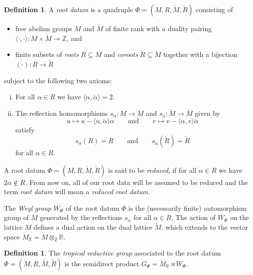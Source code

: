 \documentclass[10pt, a4paper]{amsart}
\theoremstyle{definition}
\newtheorem{definition}[theorem]{Definition}
\theoremstyle{myitemstyle}
\newcommand{\R}{\mathbb{R}}
\newcommand{\ZZ}{\mathbb{Z}}
\newcommand{\RR}{\mathbb{R}}
\newcommand{\Mcheck}{{\check{M}}}
\newcommand{\Rcheck}{\check{R}}
\newcommand{\alphacheck}{\check{\alpha}}
\begin{document}
\begin{definition}
\label{def:rootdatum}
A \emph{root datum} is a quadruple $\Phi=(M,R,\Mcheck,\Rcheck)$ consisting of 
\begin{itemize}
    \item free abelian groups $M$ and $\Mcheck$ of finite rank with a duality pairing $\langle\cdot,\cdot\rangle:M\times \Mcheck\to \ZZ$, and
    \item finite subsets of \emph{roots} $R\subseteq M$ and \emph{coroots} $\Rcheck\subseteq \Mcheck$ together with a bijection $\check{(\cdot)}\colon R\rightarrow \Rcheck$
\end{itemize}
subject to the following two axioms:
\begin{enumerate}[(i)]
    \item For all $\alpha\in R$ we have $\langle \alpha,\alphacheck\rangle=2$.
    \item The reflection homomorphisms $s_\alpha\colon M\rightarrow M$ and $s_{\check\alpha}\colon \Mcheck\rightarrow \Mcheck$ given by 
    \begin{equation*}
        u\longmapsto u-\langle u,\alphacheck\rangle \alpha \qquad \textrm{and} \qquad v\longmapsto v-\langle \alpha,v\rangle \alphacheck
    \end{equation*}
    satisfy
    \begin{equation*}
        s_\alpha(R)=R \qquad \textrm{and} \qquad s_{\check\alpha}(\Rcheck)=\Rcheck
    \end{equation*}
    for all $\alpha\in R$.
\end{enumerate}

A root datum $\Phi=(M,R,\Mcheck,\Rcheck)$ is said to be \emph{reduced}, if for all $\alpha\in R$ we have $2\alpha\notin R$. From now on, all of our root data will be assumed to be reduced and the term \emph{root datum} will mean a \emph{reduced root datum}.
\end{definition}

The \emph{Weyl group} $W_\Phi$ of the root datum $\Phi$ is the (necessarily finite) automorphism group of $M$ generated by the reflections $s_\alpha$ for all $\alpha\in R$. The action of $W_\Phi$ on the lattice $M$ defines a dual action on the dual lattice $\Mcheck$, which extends to the vector space $\Mcheck_{\RR}=\Mcheck\otimes_{\ZZ}\RR$.




\begin{definition} The \emph{tropical reductive group} associated to the root datum $\Phi=(M,R,\Mcheck,\Rcheck)$ is the semidirect product $G_{\Phi}=\Mcheck_\R\rtimes W_{\Phi}$. 
\label{def:tropicalreductivegroup}
\end{definition}
\end{document}
